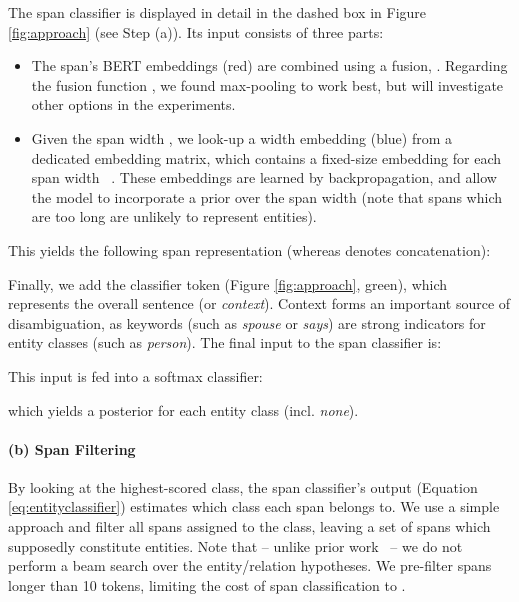 \documentclass{ecai}
\begin{document}
The span classifier is displayed in detail in the dashed box in Figure \ref{fig:approach} (see Step (a)). Its input consists of three parts:
\begin{itemize}
    \item The span's BERT embeddings (red) are combined using a fusion, .
    Regarding the fusion function , we found max-pooling to work best, but will investigate other options in the experiments.
    \item Given the span width , we look-up a width embedding  (blue) from a dedicated embedding matrix, which contains a fixed-size embedding for each span width ~\cite{lee:2017:span_coreference}.
    These embeddings are learned by backpropagation, and allow the model to incorporate a prior over the span width (note that spans which are too long are unlikely to represent entities).
\end{itemize}
This yields the following span representation (whereas  denotes concatenation):
    
Finally, we add the classifier token  (Figure \ref{fig:approach}, green), which represents the overall sentence (or {\it context}). Context forms an important source of disambiguation, as keywords (such as {\it spouse} or {\it says}) are strong indicators for entity classes (such as {\it person}).
The final input to the span classifier is: 

This input is fed into a softmax classifier:

which yields a posterior for each entity class (incl. {\it none}). 

\paragraph{(b) Span Filtering}
By looking at the highest-scored class, the span classifier's output (Equation \ref{eq:entityclassifier}) estimates which class each span belongs to. We use a simple approach and filter all spans assigned to the  class, leaving a set of spans  which supposedly constitute entities. Note that -- unlike prior work~\cite{miwa:2014:table,luan:2018:scierc} -- we do not perform a beam search over the entity/relation hypotheses. We pre-filter spans longer than 10 tokens, limiting the cost of span classification to . 
\end{document}
